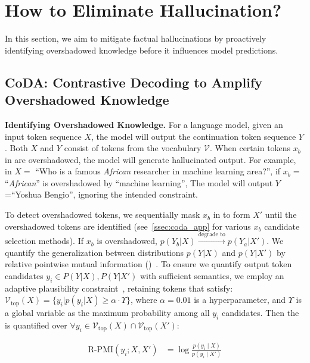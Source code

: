\section{How to Eliminate Hallucination?}
\label{sec:mitigate}


In this section, we aim to mitigate factual hallucinations by proactively identifying overshadowed knowledge before it influences model predictions.

\subsection{CoDA: Contrastive Decoding to Amplify Overshadowed Knowledge}


\noindent \textbf{Identifying Overshadowed Knowledge.}
For a language model, given an input token sequence $X$, the model will output the continuation token sequence $Y$. 
Both $X$ and $Y$ consist of tokens from the vocabulary $\mathcal{V}$.
When certain tokens $x_{b}$ in  are overshadowed, the model will generate hallucinated output.
For example, in $X = $ ``Who is a famous \textit{African} researcher in machine learning area?'', if $x_b = $ ``\textit{African}'' is overshadowed by ``machine learning'', The model will output $Y$=``Yoshua Bengio'', ignoring the intended constraint.


To detect overshadowed tokens, we sequentially mask $x_b$ in  to form $X'$ until the overshadowed tokens are identified (see~\ref{ssec:coda_app} for various $x_b$ candidate selection methods). If  $x_b$ is overshadowed, $p(Y_b|X)\xrightarrow{\text{degrade to}}p(Y_a|X')$.
We quantify the generalization between distributions $p(Y|X)$ and $p(Y|X')$ by relative pointwise mutual information ()~\cite{li-etal-2023-contrastive}. 
To ensure we quantify output token candidates $y_i\in P(Y|X), P(Y|X')$ with sufficient semantics, we employ an adaptive plausibility constraint~\citet{li-etal-2023-contrastive}, retaining tokens that satisfy: $\mathcal{V}_{\text{top}}(X) = \{y_i | p(y_i|X) \geq \alpha \cdot \Upsilon \}$, where $\alpha = 0.01$ is a hyperparameter, and $\Upsilon$ is a global variable as the maximum probability among all $y_i$ candidates.
Then the  is quantified over {\small$\forall y_i \in \mathcal{V}_{\text{top}}(X) \cap \mathcal{V}_{\text{top}}(X')$}:

\begin{small}
\begin{equation}
\begin{aligned}
\mathrm{R\text{-}PMI}(y_i; X, X') &= \log \frac{p(y_i \mid X)}{p(y_i \mid X')}
\end{aligned}
\label{eq.RPMI}
\end{equation}
\end{small}


